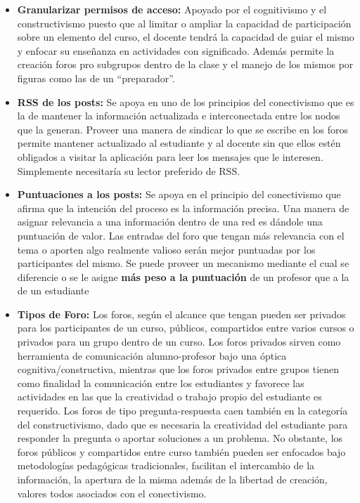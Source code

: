 \begin{itemize}
\item \textbf{Granularizar permisos de acceso:} Apoyado por el cognitivismo y el constructivismo puesto que al limitar o ampliar la capacidad de participación sobre un elemento del curso, el docente tendrá la capacidad de guiar el mismo y enfocar su enseñanza en actividades con significado. Además permite la creación foros pro subgrupos dentro de la clase y el manejo de los mismos por figuras como las de un ``preparador''.
\item \textbf{RSS de los posts:} Se apoya en uno de los principios del conectivismo que es la de mantener la información actualizada e interconectada entre los nodos que la generan. Proveer una manera de sindicar lo que se escribe en los foros permite mantener actualizado al estudiante y al docente sin que ellos estén obligados a visitar la aplicación para leer los mensajes que le interesen. Simplemente necesitaría su lector preferido de RSS.
\item \textbf{Puntuaciones a los posts:} Se apoya en el principio del conectivismo que afirma que la intención del proceso es la información precisa. Una manera de asignar relevancia a una información dentro de una red es dándole una puntuación de valor. Las entradas del foro que tengan más relevancia con el tema o aporten algo realmente valioso serán mejor puntuadas por los participantes del mismo. Se puede proveer un mecanismo mediante el cual se diferencie o se le asigne \textbf{más peso a la puntuación} de un profesor que a la de un estudiante
\item \textbf{Tipos de Foro:} Los foros, según el alcance que tengan pueden ser privados para los participantes de un curso, públicos, compartidos entre varios cursos o privados para un grupo dentro de un curso. Los foros privados sirven como herramienta de comunicación alumno-profesor bajo una óptica cognitiva/constructiva, mientras que los foros privados entre grupos tienen como finalidad la comunicación entre los estudiantes y favorece las actividades en las que la creatividad o trabajo propio del estudiante es requerido. Los foros de tipo pregunta-respuesta caen también en la categoría del constructivismo, dado que es necesaria la creatividad del estudiante para responder la pregunta o aportar soluciones a un problema. No obstante, los foros públicos y compartidos entre curso también pueden ser enfocados bajo metodologías pedagógicas tradicionales, facilitan el intercambio de la información, la apertura de la misma además de la libertad de creación, valores todos asociados con el conectivismo.
\end{itemize}

